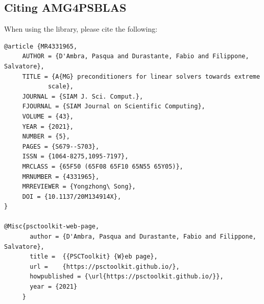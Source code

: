 \subsection*{Citing AMG4PSBLAS}
When using the library, please cite the following:

\begin{verbatim}
@article {MR4331965,
     AUTHOR = {D'Ambra, Pasqua and Durastante, Fabio and Filippone, Salvatore},
     TITLE = {A{MG} preconditioners for linear solvers towards extreme
            scale},
     JOURNAL = {SIAM J. Sci. Comput.},
     FJOURNAL = {SIAM Journal on Scientific Computing},
     VOLUME = {43},
     YEAR = {2021},
     NUMBER = {5},
     PAGES = {S679--S703},
     ISSN = {1064-8275,1095-7197},
     MRCLASS = {65F50 (65F08 65F10 65N55 65Y05)},
     MRNUMBER = {4331965},
     MRREVIEWER = {Yongzhong\ Song},
     DOI = {10.1137/20M134914X},
}

@Misc{psctoolkit-web-page,
       author = {D'Ambra, Pasqua and Durastante, Fabio and Filippone, Salvatore},
       title =  {{PSCToolkit} {W}eb page},
       url =    {https://psctoolkit.github.io/},
       howpublished = {\url{https://psctoolkit.github.io/}},
       year = {2021}
     }
\end{verbatim}


